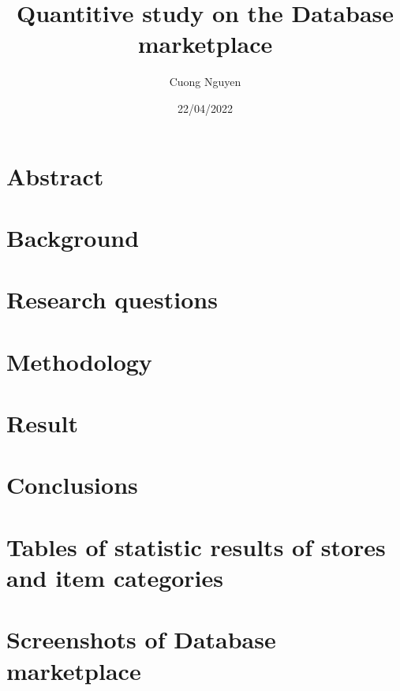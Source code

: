 \documentclass{article}
\title{Quantitive study on the Database marketplace}
\author{Cuong Nguyen}
\date{22/04/2022}
\begin{document}
    
\maketitle

\tableofcontents

\printglossary{}

\section{Abstract}\label{sec:abstract}

\section{Background}\label{sec:background}

\section{Research questions}\label{sec:research_questions}


\section{Methodology}\label{sec:method}


\section{Result}\label{sec:result}

\section{Conclusions}\label{sec:conclusion}

\printbibliography{}

\appendix
\section{Tables of statistic results of stores and item categories}


\section{Screenshots of Database marketplace}

\end{document}
